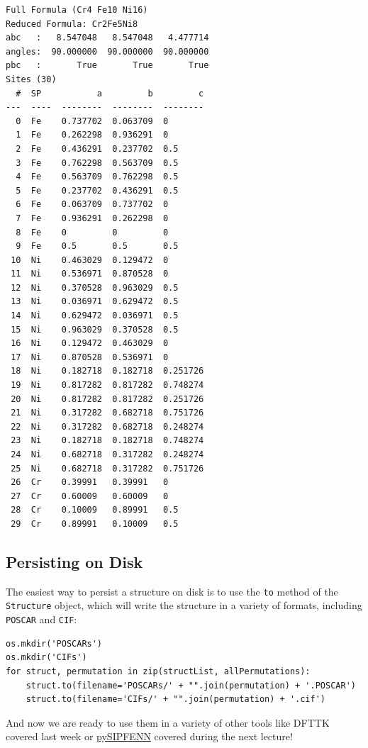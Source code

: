 \begin{verbatim}
Full Formula (Cr4 Fe10 Ni16)
Reduced Formula: Cr2Fe5Ni8
abc   :   8.547048   8.547048   4.477714
angles:  90.000000  90.000000  90.000000
pbc   :       True       True       True
Sites (30)
  #  SP           a         b         c
---  ----  --------  --------  --------
  0  Fe    0.737702  0.063709  0
  1  Fe    0.262298  0.936291  0
  2  Fe    0.436291  0.237702  0.5
  3  Fe    0.762298  0.563709  0.5
  4  Fe    0.563709  0.762298  0.5
  5  Fe    0.237702  0.436291  0.5
  6  Fe    0.063709  0.737702  0
  7  Fe    0.936291  0.262298  0
  8  Fe    0         0         0
  9  Fe    0.5       0.5       0.5
 10  Ni    0.463029  0.129472  0
 11  Ni    0.536971  0.870528  0
 12  Ni    0.370528  0.963029  0.5
 13  Ni    0.036971  0.629472  0.5
 14  Ni    0.629472  0.036971  0.5
 15  Ni    0.963029  0.370528  0.5
 16  Ni    0.129472  0.463029  0
 17  Ni    0.870528  0.536971  0
 18  Ni    0.182718  0.182718  0.251726
 19  Ni    0.817282  0.817282  0.748274
 20  Ni    0.817282  0.817282  0.251726
 21  Ni    0.317282  0.682718  0.751726
 22  Ni    0.317282  0.682718  0.248274
 23  Ni    0.182718  0.182718  0.748274
 24  Ni    0.682718  0.317282  0.248274
 25  Ni    0.682718  0.317282  0.751726
 26  Cr    0.39991   0.39991   0
 27  Cr    0.60009   0.60009   0
 28  Cr    0.10009   0.89991   0.5
 29  Cr    0.89991   0.10009   0.5
\end{verbatim}

\hypertarget{persisting-on-disk}{%
\subsection{Persisting on Disk}\label{pysipfenntutorial:persisting-on-disk}}

The easiest way to persist a structure on disk is to use the
\texttt{to} method of the
\texttt{Structure} object, which will write the
structure in a variety of formats, including
\texttt{POSCAR} and \texttt{CIF}:

\begin{verbatim}
os.mkdir('POSCARs')
os.mkdir('CIFs')
for struct, permutation in zip(structList, allPermutations):
    struct.to(filename='POSCARs/' + "".join(permutation) + '.POSCAR')
    struct.to(filename='CIFs/' + "".join(permutation) + '.cif')
\end{verbatim}

And now we are ready to use them in a variety of other tools like DFTTK
covered last week or
\href{https://pysipfenn.readthedocs.io/en/stable/}{pySIPFENN} covered
during the next lecture!

